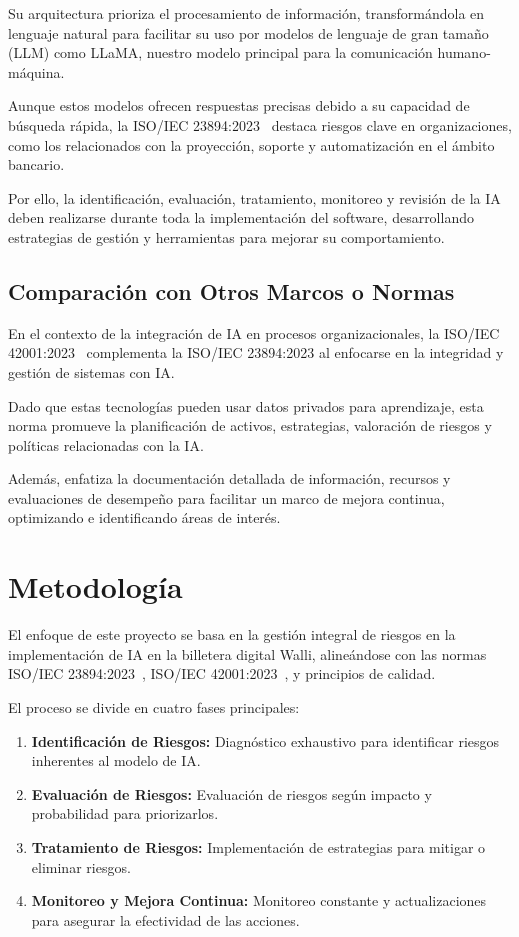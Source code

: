 \documentclass[12pt]{article}
\begin{document}
Su arquitectura prioriza el procesamiento de información, transformándola en lenguaje natural para facilitar su uso por modelos de lenguaje de gran tamaño (LLM) como LLaMA, nuestro modelo principal para la comunicación humano-máquina. 

Aunque estos modelos ofrecen respuestas precisas debido a su capacidad de búsqueda rápida, la ISO/IEC 23894:2023~\cite{iso23894} destaca riesgos clave en organizaciones, como los relacionados con la proyección, soporte y automatización en el ámbito bancario. 

Por ello, la identificación, evaluación, tratamiento, monitoreo y revisión de la IA deben realizarse durante toda la implementación del software, desarrollando estrategias de gestión y herramientas para mejorar su comportamiento.

\subsection{Comparación con Otros Marcos o Normas}
En el contexto de la integración de IA en procesos organizacionales, la ISO/IEC 42001:2023~\cite{intedya} complementa la ISO/IEC 23894:2023 al enfocarse en la integridad y gestión de sistemas con IA. 

Dado que estas tecnologías pueden usar datos privados para aprendizaje, esta norma promueve la planificación de activos, estrategias, valoración de riesgos y políticas relacionadas con la IA. 

Además, enfatiza la documentación detallada de información, recursos y evaluaciones de desempeño para facilitar un marco de mejora continua, optimizando e identificando áreas de interés.

\section{Metodología}
\label{sec:metodologia}

El enfoque de este proyecto se basa en la gestión integral de riesgos en la implementación de IA en la billetera digital Walli, alineándose con las normas ISO/IEC 23894:2023~\cite{iso23894}, ISO/IEC 42001:2023~\cite{intedya}, y principios de calidad. 

El proceso se divide en cuatro fases principales:

\begin{enumerate}
    \item \textbf{Identificación de Riesgos:} Diagnóstico exhaustivo para identificar riesgos inherentes al modelo de IA.
    \item \textbf{Evaluación de Riesgos:} Evaluación de riesgos según impacto y probabilidad para priorizarlos.
    \item \textbf{Tratamiento de Riesgos:} Implementación de estrategias para mitigar o eliminar riesgos.
    \item \textbf{Monitoreo y Mejora Continua:} Monitoreo constante y actualizaciones para asegurar la efectividad de las acciones.
\end{enumerate}
\end{document}

